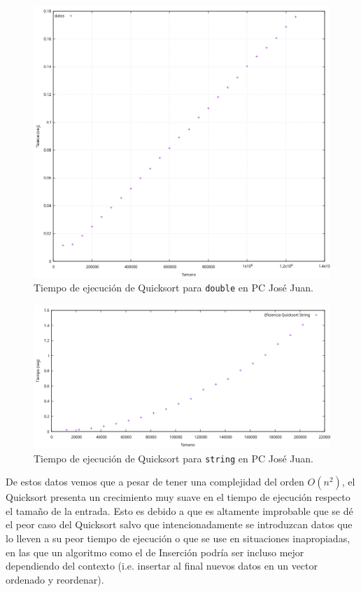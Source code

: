 \documentclass[12pt]{article}
\begin{document}
    \begin{figure}
        \centering
        \includegraphics[width=0.8\linewidth]{images/quicksort/graficas/quicksort-double-puntos.png}
        \cprotect\caption{Tiempo de ejecución de Quicksort para \verb|double| en PC José Juan.}
        \label{fig:Quicksort_double_graf}
    \end{figure}
    \begin{figure}
        \centering
        \includegraphics[width=\linewidth]{images/quicksort/graficas/quicksort-string-puntos.png}
        \cprotect\caption{Tiempo de ejecución de Quicksort para \verb|string| en PC José Juan.}
        \label{fig:Quicksort_string_graf}
    \end{figure}

    De estos datos vemos que a pesar de tener una complejidad del orden $O(n^2)$, el Quicksort presenta un crecimiento muy suave en el tiempo de ejecución respecto el tamaño de la entrada. Esto es debido a que es altamente improbable que se dé el peor caso del Quicksort salvo que intencionadamente se introduzcan datos que lo lleven a su peor tiempo de ejecución o que se use en situaciones inapropiadas, en las que un algoritmo como el de Inserción podría ser incluso mejor dependiendo del contexto (i.e. insertar al final nuevos datos en un vector ordenado y reordenar).
    
\end{document}
